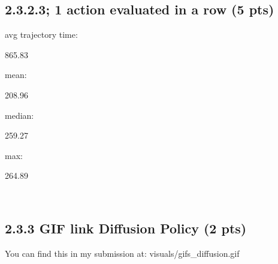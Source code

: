 \documentclass[12pt]{article}
\begin{document}
\subsection*{2.3.2.3; 1 action evaluated in a row (5 pts)}
avg trajectory time: \begin{tcolorbox}[fit,height=1cm, width=2cm, blank, borderline={1pt}{1pt},nobeforeafter]
    \begin{center}
    \vspace{3mm}
    \large{865.83}
    \end{center}
\end{tcolorbox}
mean: \begin{tcolorbox}[fit,height=1cm, width=2cm, blank, borderline={1pt}{1pt},nobeforeafter]
    \begin{center}
    \vspace{3mm}
    \large{208.96}
    \end{center}
\end{tcolorbox}
median: \begin{tcolorbox}[fit,height=1cm, width=2cm, blank, borderline={1pt}{1pt},nobeforeafter]
    \begin{center}
    \vspace{3mm}
    \large{259.27}
    \end{center}
\end{tcolorbox}
max: \begin{tcolorbox}[fit,height=1cm, width=2cm, blank, borderline={1pt}{1pt},nobeforeafter]
    \begin{center}
    \vspace{3mm}
    \large{264.89}
    \end{center}
\end{tcolorbox}
    \\

\subsection*{2.3.3 GIF link Diffusion Policy (2 pts)}

\begin{tcolorbox}[fit,height=5em, width=40em, blank, borderline={1pt}{1pt},nobeforeafter]
               \vspace*{1em}
    You can find this in my submission at:
    visuals/gifs\_diffusion.gif

\end{tcolorbox}
    
\end{document}
